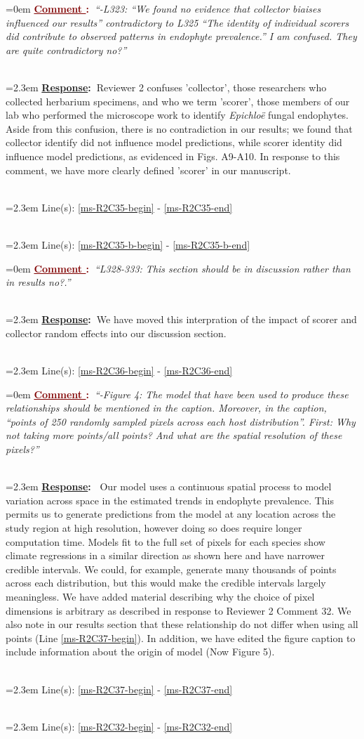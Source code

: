 \documentclass[12pt]{article}
\newcounter{cN}
\newcommand{\comment}[1]{
	\vspace{2em}
	\refstepcounter{cN} %
	\noindent \hangindent=0em \textbf{\textcolor{Maroon}{\uline{Comment \thecN}:~}}\emph{``#1''}
	}
\newcommand{\response}[1]{
	\\[0.25em]
	\hangindent=2.3em \textbf{\textcolor{NavyBlue}{\uline{Response}:~}}#1
	}
\newcommand{\linesref}[2]{
		\\[0.25em]
	\hangindent=2.3em {\color{Mahogany} Line(s): \ref{#1} - \ref{#2}}
}
\begin{document}
\comment{-L323: “We found no evidence that collector biaises influenced our results” contradictory to L325 “The identity of individual scorers did contribute to observed patterns in endophyte prevalence.” I am confused. They are quite contradictory no?}
\response{Reviewer 2 confuses 'collector', those researchers who collected herbarium specimens, and who we term 'scorer', those members of our lab who performed the microscope work to identify \emph{Epichloë} fungal endophytes. Aside from this confusion, there is no contradiction in our results; we found that collector identify did not influence model predictions, while scorer identity did influence model predictions, as evidenced in Figs. A9-A10. In response to this comment, we have more clearly defined 'scorer' in our manuscript.}
\linesref{ms-R2C35-begin}{ms-R2C35-end}
\linesref{ms-R2C35-b-begin}{ms-R2C35-b-end}


\comment{L328-333: This section should be in discussion rather than in results no?.}
\response{We have moved this interpration of the impact of scorer and collector random effects into our discussion section.}
\linesref{ms-R2C36-begin}{ms-R2C36-end}


\comment{-Figure 4: The model that have been used to produce these relationships should be mentioned in the caption. Moreover, in the caption, “points of 250 randomly sampled pixels across each host distribution”. First: Why not taking more points/all points? And what are the spatial resolution of these pixels?}
\response{ Our model uses a continuous spatial process to model variation across space in the estimated trends in endophyte prevalence. This permits us to generate predictions from the model at any location across the study region at high resolution, however doing so does require longer computation time. Models fit to the full set of pixels for each species show climate regressions in a similar direction as shown here and have narrower credible intervals. We could, for example, generate many thousands of points across each distribution, but this would make the credible intervals largely meaningless. We have added material describing why the choice of pixel dimensions is arbitrary as described in response to Reviewer 2 Comment 32. We also note in our results section that these relationship do not differ when using all points (Line \ref{ms-R2C37-begin}). In addition, we have edited the figure caption to include information about the origin of model (Now Figure 5).}
\linesref{ms-R2C37-begin}{ms-R2C37-end}
\linesref{ms-R2C32-begin}{ms-R2C32-end}
\end{document}
